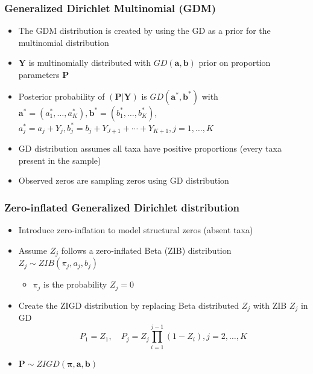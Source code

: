 \documentclass{beamer}
\begin{document}
\begin{frame}
\frametitle{Generalized Dirichlet Multinomial (GDM)}
\begin{itemize}
  \item The GDM distribution is created by using the GD as a prior for the multinomial distribution
  \item $\bm{Y}$ is multinomially distributed with $GD(\bm{a}, \bm{b})$ prior on proportion parameters $\bm{P}$
  \item Posterior probability of $(\bm{P}|\bm{Y})$ is $GD(\bm{a}^*, \bm{b}^*)$ with $\bm{a}^* = (a_1^*, \ldots , a_K^*), \bm{b}^* = (b^*_1, \ldots , b_K^*)$, $a_j^* = a_j + Y_j, b_j^* = b_j + Y_{J + 1} + \cdots + Y_{K + 1}, j = 1, \ldots , K$
    \item GD distribution assumes all taxa have positive proportions (every taxa present in the sample)
    \item Observed zeros are sampling zeros using GD distribution
\end{itemize}
\end{frame}

\begin{frame}
\frametitle{Zero-inflated Generalized Dirichlet distribution}
\begin{itemize}

  \item Introduce zero-inflation to model structural zeros (absent taxa)
  \item Assume $Z_j$ follows a zero-inflated Beta (ZIB) distribution $Z_j \sim ZIB(\pi_j, a_j, b_j)$
  \begin{itemize}
    \item $\pi_j$ is the probability $Z_j = 0$
  \end{itemize}
  \item Create the ZIGD distribution by replacing Beta distributed $Z_j$ with ZIB $Z_j$ in GD
  $$P_1 = Z_1, \quad P_j = Z_j \prod_{i = 1}^{j-1}(1 - Z_i), j = 2, \ldots , K$$
  \item $\bm{P} \sim ZIGD(\boldsymbol\pi, \bm{a}, \bm{b})$
\end{itemize}
\end{frame}
\end{document}
